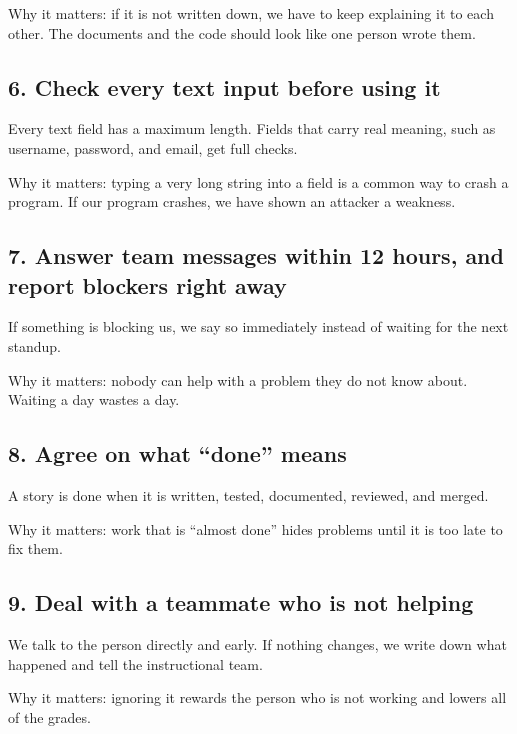 \documentclass[11pt]{article}
\newcommand{\norm}[1]{\subsection*{#1}}
\begin{document}
Why it matters: if it is not written down, we have to keep explaining it to each other. The
documents and the code should look like one person wrote them.

\norm{6. Check every text input before using it}
Every text field has a maximum length. Fields that carry real meaning, such as username,
password, and email, get full checks.

Why it matters: typing a very long string into a field is a common way to crash a program. If
our program crashes, we have shown an attacker a weakness.

\norm{7. Answer team messages within 12 hours, and report blockers right away}
If something is blocking us, we say so immediately instead of waiting for the next standup.

Why it matters: nobody can help with a problem they do not know about. Waiting a day wastes a
day.
\unchanged

\norm{8. Agree on what ``done'' means}
A story is done when it is written, tested, documented, reviewed, and merged.

Why it matters: work that is ``almost done'' hides problems until it is too late to fix them.

\norm{9. Deal with a teammate who is not helping}
We talk to the person directly and early. If nothing changes, we write down what happened and
tell the instructional team.

Why it matters: ignoring it rewards the person who is not working and lowers all of the
grades.
\unchanged
\end{document}
